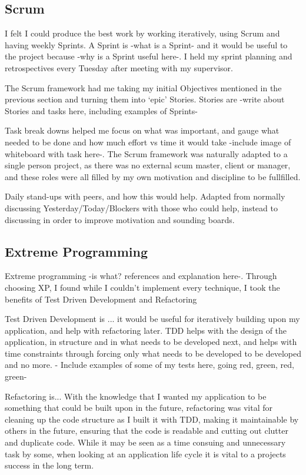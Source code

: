 \subsection{Scrum}
I felt I could produce the best work by working iteratively, using Scrum and having weekly Sprints. A Sprint is -what is a Sprint- and it would be useful to the project because -why is a Sprint useful here-. I held my sprint planning and retrospectives every Tuesday after meeting with my supervisor. 

The Scrum framework had me taking my initial Objectives mentioned in the previous section and turning them into `epic' Stories. Stories are -write about Stories and tasks here, including examples of Sprints-

Task break downs helped me focus on what was important, and gauge what needed to be done and how much effort vs time it would take -include image of whiteboard with task here-. The Scrum framework was naturally adapted to a single person project, as there was no external scum master, client or manager, and these roles were all filled by my own motivation and discipline to be fullfilled.

Daily stand-ups with peers, and how this would help. Adapted from normally discussing Yesterday/Today/Blockers with those who could help, instead to discussing in order to improve motivation and sounding boards.

\subsection{Extreme Programming}
Extreme programming -is what? references and explanation here-. Through choosing XP, I found while I couldn't implement every technique, I took the benefits of Test Driven Development and Refactoring

Test Driven Development is ... it would be useful for iteratively building upon my application, and help with refactoring later. TDD helps with the design of the application, in structure and in what needs to be developed next, and helps with time constraints through forcing only what needs to be developed to be developed and no more. - Include examples of some of my tests here, going red, green, red, green-

Refactoring is... With the knowledge that I wanted my application to be something that could be built upon in the future, refactoring was vital for cleaning up the code structure as I built it with TDD, making it maintainable by others in the future, ensuring that the code is readable and cutting out clutter and duplicate code. While it may be seen as a time consuing and unnecessary task by some, when looking at an application life cycle it is vital to a projects success in the long term.

